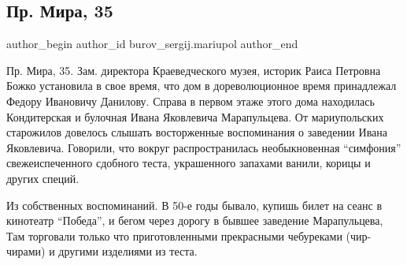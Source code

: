  
 
 
 
 

\subsection{Пр. Мира, 35}
\label{sec:27_11_2021.fb.burov_sergij.mariupol.1.pr__mira__35}

\ifcmt
 author_begin
   author_id burov_sergij.mariupol
 author_end
\fi

Пр. Мира, 35. Зам. директора Краеведческого музея, историк Раиса Петровна Божко
установила в свое время, что дом в дореволюционное время принадлежал Федору
Ивановичу Данилову. Справа в первом этаже этого дома находилась Кондитерская и
булочная Ивана Яковлевича Марапульцева. От мариупольских старожилов довелось
слышать восторженные воспоминания о заведении Ивана Яковлевича. Говорили, что
вокруг распространилась необыкновенная \enquote{симфония} свежеиспеченного сдобного
теста, украшенного запахами ванили, корицы и других специй. 


Из собственных воспоминаний. В 50-е годы бывало, купишь билет на сеанс в
кинотеатр \enquote{Победа}, и бегом через дорогу в бывшее заведение Марапульцева, Там
торговали только что приготовленными прекрасными чебуреками (чир-чирами) и
другими изделиями из теста.

